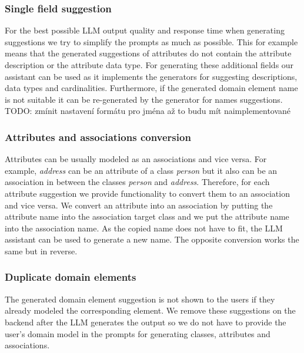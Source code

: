 \subsubsection{Single field suggestion}

For the best possible LLM output quality and response time when generating suggestions we try to simplify the prompts as much as possible. This for example means that the generated suggestions of attributes do not contain the attribute description or the attribute data type. For generating these additional fields our assistant can be used as it implements the generators for suggesting descriptions, data types and cardinalities. Furthermore, if the generated domain element name is not suitable it can be re-generated by the generator for names suggestions. \\

\noindent{}TODO: zmínit nastavení formátu pro jména až to budu mít naimplementované \\


\subsubsection{Attributes and associations conversion}

Attributes can be usually modeled as an associations and vice versa. For example, \textit{address} can be an attribute of a class \textit{person} but it also can be an association in between the classes \textit{person} and \textit{address}. Therefore, for each attribute suggestion we provide functionality to convert them to an association and vice versa. We convert an attribute into an association by putting the attribute name into the association target class and we put the attribute name into the association name. As the copied name does not have to fit, the LLM assistant can be used to generate a new name. The opposite conversion works the same but in reverse.


\subsubsection{Duplicate domain elements}
\label{duplicate_domain_elements}

The generated domain element suggestion is not shown to the users if they already modeled the corresponding element. We remove these suggestions on the backend after the LLM generates the output so we do not have to provide the user's domain model in the prompts for generating classes, attributes and associations.

